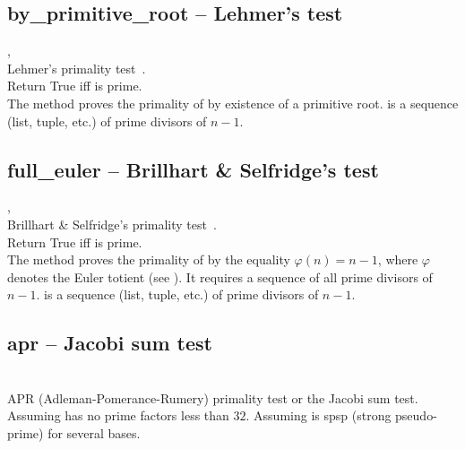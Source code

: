  \subsection{by\_primitive\_root -- Lehmer's test}
   {,\ }{}\\
   \spacing
   \quad Lehmer's primality test~\cite{Lehmer1927}.\\
   \spacing
   \quad Return True iff  is prime.\\
    The method proves the primality of  by existence of a primitive
    root.
   \spacing
   \quad {} is a sequence (list, tuple, etc.) of prime divisors
   of $n - 1$.
%
 \subsection{full\_euler -- Brillhart \& Selfridge's test}
   {,\ }{}\\
   \spacing
   \quad Brillhart \& Selfridge's primality test~\cite{BS1967}.\\
   \spacing
   \quad Return True iff  is prime.\\
    The method proves the primality of  by the equality
    $\varphi(n) = n - 1$, where $\varphi$ denotes the Euler totient
    (see ).
    It requires a sequence of all prime divisors of $n - 1$.
   \spacing
   \quad {} is a sequence (list, tuple, etc.) of prime divisors
   of $n - 1$.
   \quad
%
 \subsection{apr -- Jacobi sum test}
   {}{}\\
   \spacing
   \quad APR (Adleman-Pomerance-Rumery) primality test or the Jacobi sum test.\\
   \spacing
   \quad Assuming  has no prime factors less than $32$.
    Assuming  is spsp (strong pseudo-prime) for several bases.
%
